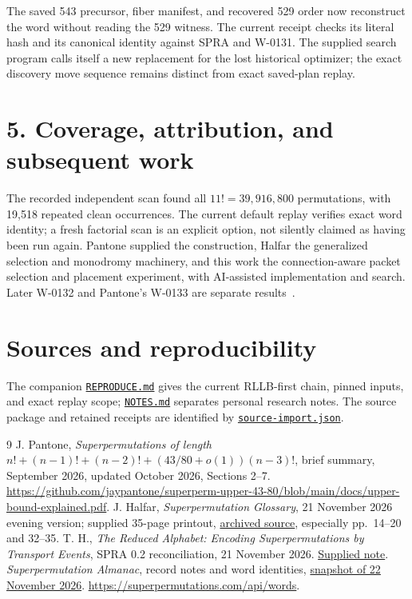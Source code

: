 \documentclass[11pt]{article}
\begin{document}
The saved 543 precursor, fiber manifest, and recovered 529 order now
reconstruct the word without reading the 529 witness. The current receipt
checks its literal hash and its canonical identity against SPRA and W-0131.
The supplied search program calls itself a new replacement for the lost
historical optimizer; the exact discovery move sequence remains distinct
from exact saved-plan replay.

\section*{5. Coverage, attribution, and subsequent work}
The recorded independent scan found all $11!=39{,}916{,}800$ permutations,
with 19,518 repeated clean occurrences. The current default replay verifies
exact word identity; a fresh factorial scan is an explicit option, not
silently claimed as having been run again.
Pantone supplied the construction, Halfar the generalized selection and
monodromy machinery, and this work the connection-aware packet selection
and placement experiment, with AI-assisted implementation and search.
Later W-0132 and Pantone's W-0133 are separate results~\cite{almanac}.

\section*{Sources and reproducibility}
The companion \href{REPRODUCE.md}{\texttt{REPRODUCE.md}} gives the current
RLLB-first chain, pinned inputs, and exact replay scope;
\href{NOTES.md}{\texttt{NOTES.md}} separates personal research notes.
The source package and retained receipts are identified by
\href{source-import.json}{\texttt{source-import.json}}.

\begin{thebibliography}{9}\footnotesize
\setlength{\itemsep}{2pt}
 J. Pantone,
\emph{Superpermutations of length
$n!+(n-1)!+(n-2)!+(43/80+o(1))(n-3)!$}, brief summary,
September 2026, updated October 2026, Sections 2--7.
\url{https://github.com/jaypantone/superperm-upper-43-80/blob/main/docs/upper-bound-explained.pdf}.
 J. Halfar, \emph{Superpermutation Glossary},
21 November 2026 evening version; supplied 35-page printout,
\href{../../rllb/sources/Glossary.pdf}{archived source}, especially pp.~14--20 and 32--35.
 T. H., \emph{The Reduced Alphabet: Encoding Superpermutations
by Transport Events}, SPRA 0.2 reconciliation, 21 November 2026.
\href{../../rllb/sources/the-reduced-alphabet-spra-0.2-reconciled.md}{Supplied note}.
 \emph{Superpermutation Almanac}, record notes and word identities,
\href{../../rllb/almanac-snapshot.json}{snapshot of 22 November 2026}.
\url{https://superpermutations.com/api/words}.
\end{thebibliography}
\end{document}
